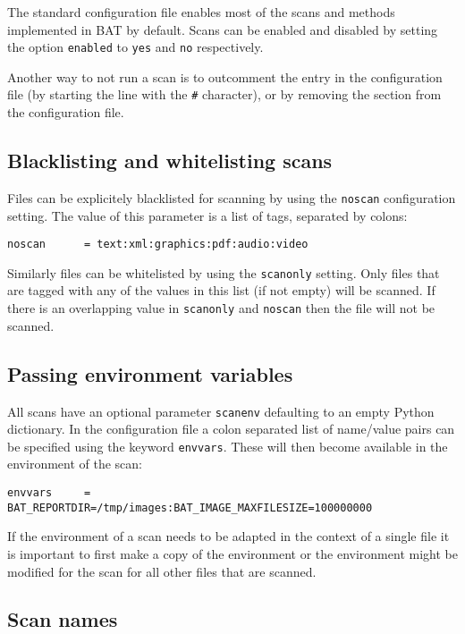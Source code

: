 \documentclass[10pt,a4paper]{article}
\begin{document}
The standard configuration file enables most of the scans and methods
implemented in BAT by default. Scans can be enabled and disabled by setting the
option \texttt{enabled} to \texttt{yes} and \texttt{no} respectively.

Another way to not run a scan is to outcomment the entry in the configuration
file (by starting the line with the \texttt{\#} character), or by removing the
section from the configuration file.

\subsection{Blacklisting and whitelisting scans}

Files can be explicitely blacklisted for scanning by using the \texttt{noscan}
configuration setting. The value of this parameter is a list of tags, separated
by colons:

\begin{verbatim}
noscan      = text:xml:graphics:pdf:audio:video
\end{verbatim}

Similarly files can be whitelisted by using the \texttt{scanonly} setting. Only
files that are tagged with any of the values in this list (if not empty) will
be scanned. If there is an overlapping value in \texttt{scanonly} and
\texttt{noscan} then the file will not be scanned.

\subsection{Passing environment variables}

All scans have an optional parameter \texttt{scanenv} defaulting to an empty
Python dictionary. In the configuration file a colon separated list of
name/value pairs can be specified using the keyword \texttt{envvars}. These will
then become available in the environment of the scan:

\begin{verbatim}
envvars     = BAT_REPORTDIR=/tmp/images:BAT_IMAGE_MAXFILESIZE=100000000
\end{verbatim}

If the environment of a scan needs to be adapted in the context of a single
file it is important to first make a copy of the environment or the
environment might be modified for the scan for all other files that are scanned.

\subsection{Scan names}
\end{document}
